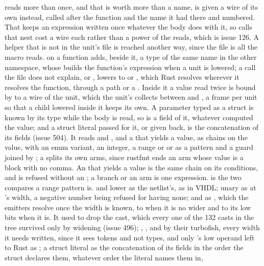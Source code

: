 reads more than once, and that is worth more than a name, is given a
wire of its own instead, called after the function and the name it had
there and numbered. That keeps an expression written once whatever the
body does with it, so calls that nest cost a wire each rather than a
power of the reads, which is issue 126.
A helper that is not in the unit's file is reached another way, since
the file is all the macro reads. \code{\#[lower]} on a function adds,
beside it, a type of the same name in the other namespace, whose
 builds the function's expression when a unit is
lowered; a call the file does not explain,  or
, lowers to  or
, which Rust resolves wherever it resolves
the function, through a path or a . Inside it a value read
twice is bound by  to a wire of the unit, which
the unit's  collects between  and
, a frame per unit so that a child lowered inside
it keeps its own. A parameter typed as a struct is known by its type
while the body is read, so  is a field of it, whatever
computed the value; and a struct literal passed for it, or given back,
is the concatenation of its fields (issue 504). It reads  and ,
and a  that yields a value, as chains on the value, with
an enum variant, an integer, a range  or 
or \code{\_} as a pattern and a guard joined by \code{\&\&}; a
 splits its own arms, since rustfmt ends an arm whose
value is a block with no comma. An  that yields a value is the
same chain on its conditions, and is refused without an ;
a branch or an arm is one expression. 
is the two compares a range pattern is. \code{*} and \code{\%} lower as
the netlist's, \code{\%} as  in VHDL; unary \code{-} as
 at 's width, a negative number being refused
for having none; and  as , which the
emitters resolve once the width is known, to  when it is no
wider and to its low bits when it is. It used to drop the cast, which
every one of the 132 casts in the tree survived only by widening
(issue 496); ,
,  and  by their turbofish, every
width it needs written, since it sees tokens and not types, and only
's low operand left to Rust as \code{\_}; a
struct literal as the concatenation of its fields in the order the
struct declares them, whatever order the literal names them in,
